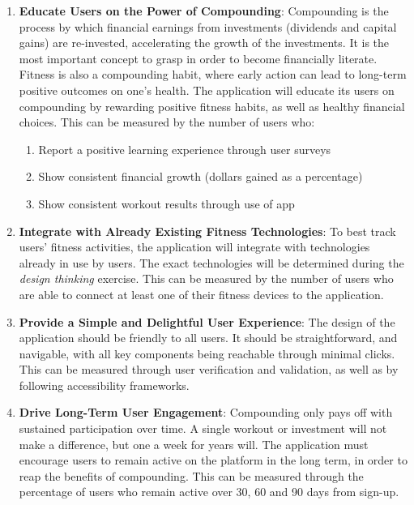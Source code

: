 \documentclass{article}
\begin{document}
\begin{enumerate}
    \item \textbf{Educate Users on the Power of Compounding}: Compounding is the process by which financial earnings from investments (dividends and capital gains) are re-invested, accelerating the growth of the investments.
    It is the most important concept to grasp in order to become financially literate.
    Fitness is also a compounding habit, where early action can lead to long-term positive outcomes on one's health.
    The application will educate its users on compounding by rewarding positive fitness habits, as well as healthy financial choices.
    This can be measured by the number of users who:
    \begin{enumerate}
        \item Report a positive learning experience through user surveys
        \item Show consistent financial growth (dollars gained as a percentage)
        \item Show consistent workout results through use of app
    \end{enumerate}
    \item \textbf{Integrate with Already Existing Fitness Technologies}: To best track users' fitness activities, the application will integrate with technologies already in use by users.
    The exact technologies will be determined during the \textit{design thinking} exercise.
    This can be measured by the number of users who are able to connect at least one of their fitness devices to the application.
    \item \textbf{Provide a Simple and Delightful User Experience}: The design of the application should be friendly to all users.
    It should be straightforward, and navigable, with all key components being reachable through minimal clicks.
    This can be measured through user verification and validation, as well as by following accessibility frameworks.
    \item \textbf{Drive Long-Term User Engagement}: Compounding only pays off with sustained participation over time.
    A single workout or investment will not make a difference, but one a week for years will.
    The application must encourage users to remain active on the platform in the long term, in order to reap the benefits of compounding.
    This can be measured through the percentage of users who remain active over 30, 60 and 90 days from sign-up.
\end{enumerate}
\end{document}
